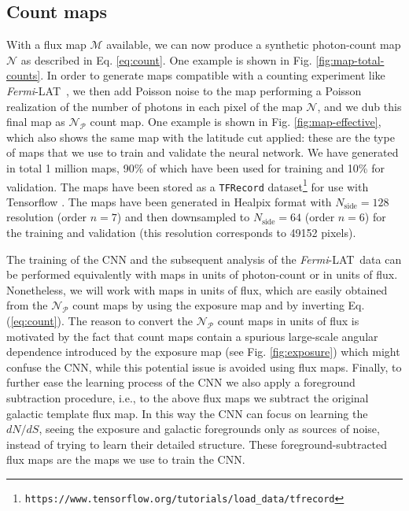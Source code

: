 \documentclass[a4paper,11pt]{article}
\newcommand{\fermi}{\textsl{Fermi}-LAT\ }
\newcommand{\dnds}{dN/dS }
\begin{document}
\subsection{Count maps}

With a flux map $\mathcal{M}$ available, we can now produce a synthetic photon-count map $\mathcal{N}$ as described in Eq. \ref{eq:count}. 
One example is shown in Fig. \ref{fig:map-total-counts}. 
In order to generate maps compatible with a counting experiment like \fermi, we then add Poisson noise to the map performing a Poisson realization of the number of photons in each pixel of the map $\mathcal{N}$, and we dub this final map as $\mathcal{N}_\mathcal{P}$ count map. One example is shown in Fig. \ref{fig:map-effective}, which also shows the same map with the latitude cut applied: these are the type of maps that we use to train and validate the neural network. We have generated in total 1 million maps, 90\% of which have been used for training and 10\% for validation. The maps have been stored as a \verb|TFRecord| dataset\footnote{\verb|https://www.tensorflow.org/tutorials/load_data/tfrecord|} for use with Tensorflow \cite{tensorflow2015-whitepaper}. The maps have been generated in Healpix format with $N_\textrm{side} = 128$ resolution (order $n=7$) and then downsampled to $N_\textrm{side} = 64$ (order $n=6$) for the training and validation (this resolution corresponds to 49152 pixels). 

The training of the CNN and the subsequent analysis of the \fermi data can be performed equivalently with maps in units of photon-count or in units of flux. Nonetheless, we will work with maps in units of flux, which are easily obtained from the $\mathcal{N}_\mathcal{P}$ count maps by using the exposure map and by inverting Eq. (\ref{eq:count}).  The reason to convert the $\mathcal{N}_\mathcal{P}$ count maps in units of flux is motivated by the fact that 
count maps contain a spurious large-scale angular dependence
introduced by the exposure map (see Fig. \ref{fig:exposure}) which
might confuse the CNN, while this potential issue is avoided
using flux maps.
Finally, to further ease the learning process of the CNN
we also apply a foreground subtraction procedure,
i.e., to the above flux maps we subtract the original
galactic template flux map.
In this way the CNN can focus on learning the $\dnds$, seeing the exposure and galactic foregrounds only as sources of noise, instead of trying to learn their detailed structure. These foreground-subtracted flux maps are the maps we use to train the CNN. 
\end{document}
